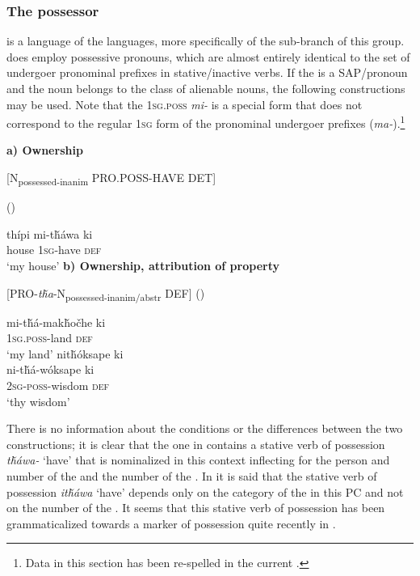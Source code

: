 \documentclass[output=paper]{LSP/langsci}
\begin{document}
\subsubsection{The possessor}
 is a language of the  languages, more specifically of the  sub-branch of this group.  does employ possessive pronouns, which are almost entirely identical to the set of undergoer pronominal prefixes in stative/inactive verbs. If the  is a SAP/pronoun and the  noun belongs to the class of alienable nouns, the following constructions may be used. Note that the \textsc{1sg.poss} \textit{mi-} is a special form that does not correspond to the regular \textsc{1sg} form of the pronominal undergoer prefixes (\textit{ma-}).\footnote{Data in this section has been re-spelled in the current  .}

\vspace{1em}
\textbf{a)	Ownership}

[N\textsubscript{possessed-inanim} PRO.POSS-HAVE DET]
\vspace{1em}

\ea {} (\citealt[98]{Buechel1939}) \label{lakotahouse}

\gll thípi     mi-t\v{h}áwa ki \\
house \textsc{1sg}-have  \textsc{def} \\
\glt `my house'
\z
\vspace{1em}
\textbf{b) Ownership, attribution of property}

[PRO-\textit{t\v{h}a}-N\textsubscript{possessed-inanim/abstr} DEF]
\vspace{1em}
\ea {} (\citealt[98]{Buechel1939}) \label{lakotalandwisdom}

\ea \gll mi-t\v{h}á-mak\v{h}o\v{c}he   ki \\
\textsc{1sg.poss}-land   \textsc{def} \\
\glt `my land'
\ex  
\glll nit\v{h}óksape ki \\
 ni-t\v{h}á-wóksape   ki \\
\textsc{2sg-poss}-wisdom  \textsc{def} \\
\glt `thy wisdom'
\z \z

There is no information about the conditions or the differences between the two constructions; it is clear that the one in  contains a stative verb of possession \textit{t\v{h}áwa-} `have' that is nominalized in this context inflecting for the person and number of the  and the number of the . In \citet[458]{RoodTaylor1996} it is said that the stative verb of possession \textit{it\v{h}áwa} `have' depends only on the category of the  in this PC and not on the number of the . It seems that this stative verb of possession has been grammaticalized towards a marker of possession quite recently in . 
\end{document}

